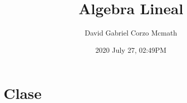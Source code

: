\documentclass{book}
\title{Algebra Lineal}
\date{2020 July 27, 02:49PM}
\author{David Gabriel Corzo Mcmath}
\begin{document}
\maketitle
 \tableofcontents

\chapter{Clase}
% 



\end{document}
